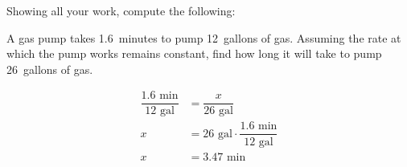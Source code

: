 \documentclass[12pt,letterpaper]{exam}
\begin{document}
\begin{questions}

\vfill

\question[6] Showing all your work, compute the following: \pspace
{} \vfill





\newpage
\question[6] A gas pump takes 1.6~minutes to pump 12~gallons of gas. Assuming the rate at which the pump works remains constant, find how long it will take to pump 26~gallons of gas. \pspace

	\[
	\begin{aligned}
	\dfrac{1.6 \text{ min}}{12 \text{ gal}}&= \dfrac{x}{26 \text{ gal}} \\[0.3cm]
	x&= 26 \text{ gal} \cdot \dfrac{1.6 \text{ min}}{12 \text{ gal}} \\[0.3cm]
	x&= 3.47 \text{ min}
	\end{aligned}
	\]






\end{questions}
\end{document}
